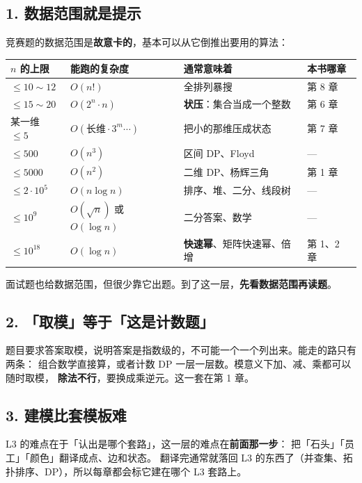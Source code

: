 \subsection*{1. 数据范围就是提示}

竞赛题的数据范围是\textbf{故意卡的}，基本可以从它倒推出要用的算法：

\begin{center}
\begin{tabular}{@{}l l l l@{}}
\toprule
\textbf{$n$ 的上限} & \textbf{能跑的复杂度} & \textbf{通常意味着} & \textbf{本书哪章}\\
\midrule
$\le 10 \sim 12$ & $O(n!)$ & 全排列暴搜 & 第 8 章\\
$\le 15 \sim 20$ & $O(2^n \cdot n)$ & \textbf{状压}：集合当成一个整数 & 第 6 章\\
某一维 $\le 5$ & $O(\text{长维} \cdot 3^m \cdots)$ & 把小的那维压成状态 & 第 7 章\\
$\le 500$ & $O(n^3)$ & 区间 DP、Floyd & —\\
$\le 5000$ & $O(n^2)$ & 二维 DP、杨辉三角 & 第 1 章\\
$\le 2 \cdot 10^5$ & $O(n \log n)$ & 排序、堆、二分、线段树 & —\\
$\le 10^9$ & $O(\sqrt n)$ 或 $O(\log n)$ & 二分答案、数学 & —\\
$\le 10^{18}$ & $O(\log n)$ & \textbf{快速幂}、矩阵快速幂、倍增 & 第 1、2 章\\
\bottomrule
\end{tabular}
\end{center}

\begin{principle}
面试题也给数据范围，但很少靠它出题。到了这一层，\textbf{先看数据范围再读题}。
\end{principle}

\subsection*{2. 「取模」等于「这是计数题」}

题目要求答案取模，说明答案是指数级的，不可能一个一个列出来。能走的路只有两条：
组合数学直接算，或者计数 DP 一层一层数。模意义下加、减、乘都可以随时取模，
\textbf{除法不行}，要换成乘逆元。这一套在第 1 章。

\subsection*{3. 建模比套模板难}

L3 的难点在于「认出是哪个套路」，这一层的难点在\textbf{前面那一步}：
把「石头」「员工」「颜色」翻译成点、边和状态。
翻译完通常就落回 L3 的东西了（并查集、拓扑排序、DP），所以每章都会标它建在哪个 L3 套路上。

